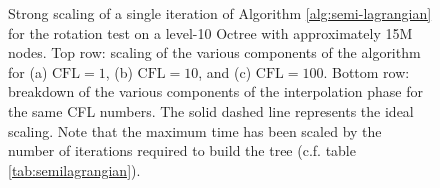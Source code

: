 \begin{figure}[htbp]
\begin{center}
	\end{center}
	\caption{Strong scaling of a single iteration of Algorithm \ref{alg:semi-lagrangian} for the rotation test on a level-10 Octree with approximately 15M nodes. Top row: scaling of the various components of the algorithm for (a) $\text{CFL} = 1$, (b) $\text{CFL} = 10$, and (c) $\text{CFL} = 100$. Bottom row: breakdown of the various components of the interpolation phase for the same CFL numbers. The solid dashed line represents the ideal scaling. Note that the maximum time has been scaled by the number of iterations required to build the tree (c.f. table \ref{tab:semilagrangian}).}
	\label{fig:semilagrangian_small}
\end{figure}

